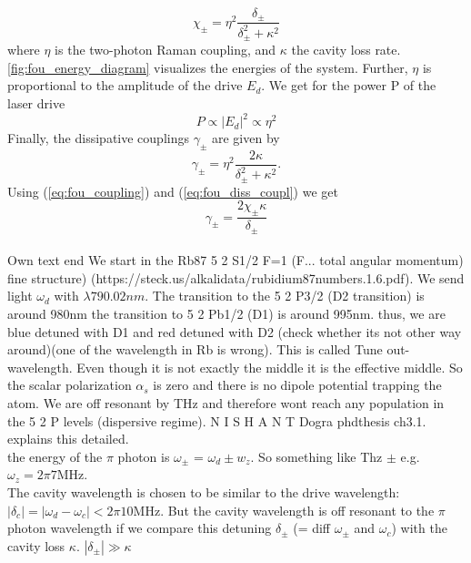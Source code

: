 \begin{equation}\label{eq:fou_coupling}
	\chi_\pm = \eta^2 \frac{\delta_\pm}{\delta_\pm^2 + \kappa^2}
\end{equation}
where $\eta$ is the two-photon Raman coupling, and $\kappa$ the cavity loss rate. \autoref{fig:fou_energy_diagram} visualizes the energies of the system. Further, $\eta$ is proportional to the amplitude of the drive $E_d$. We get for the power P of the laser drive
\begin{equation}\label{eq:fou_power_eta_prop}
	P \propto |E_d|^2 \propto \eta^2
\end{equation} 
Finally, the dissipative couplings $\gamma_\pm$ are given by 
\begin{equation}\label{eq:fou_diss_coupl}
	\gamma_\pm = \eta^2 \frac{2 \kappa}{\delta_\pm^2 + \kappa^2}.
\end{equation}
Using (\ref{eq:fou_coupling}) and (\ref{eq:fou_diss_coupl}) we get
\begin{equation}
	\gamma_\pm = \frac{2 \chi_\pm \kappa}{\delta_\pm}
\end{equation}
\\
Own text end
We start in the Rb87 5 2 S1/2 F=1 (F... total angular momentum) fine structure) (https://steck.us/alkalidata/rubidium87numbers.1.6.pdf). We send light $\omega_d$ with $\lambda 790.02nm$. The transition to the  5 2 P3/2 (D2 transition) is around 980nm the transition to 5 2 Pb1/2 (D1) is around 995nm. thus, we are blue detuned with D1 and red detuned with D2 (check whether its not other way around)(one of the wavelength in Rb is wrong). This is called Tune out-wavelength. Even though it is not exactly the middle it is the effective middle. So the scalar polarization $\alpha_s$ is zero and there is no dipole potential trapping the atom. We are off resonant by THz and therefore wont reach any population in the 5 2 P levels (dispersive regime). N I S H A N T  Dogra phdthesis ch3.1. explains this detailed.
\\
the energy of the $\pi$ photon is $\omega_\pm$ = $\omega_d \pm w_z$. So something like Thz $\pm$ e.g. $\omega_z = 2\pi 7 $MHz.
\\
The cavity wavelength is chosen to be similar to the drive wavelength: $|\delta_c| = |\omega_d - \omega_c| < 2\pi 10$MHz. But the cavity wavelength is off resonant to the $\pi$ photon wavelength if we compare this detuning $\delta_\pm$ (= diff $\omega_\pm$ and $\omega_c$) with the cavity loss $\kappa$. $|\delta_\pm | \gg \kappa$
